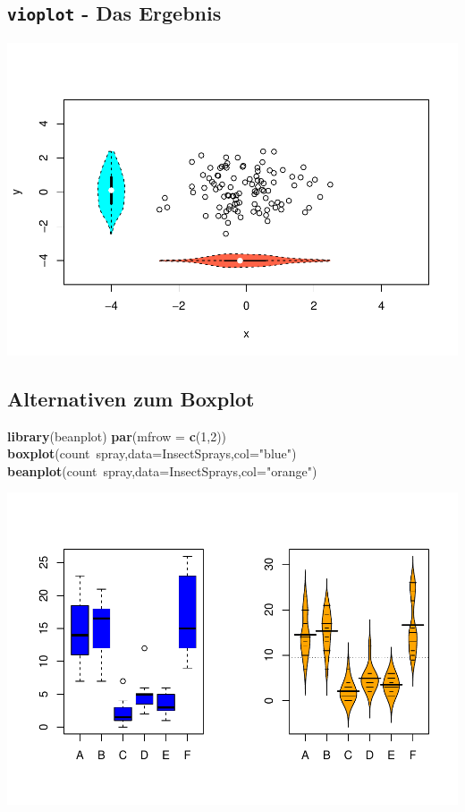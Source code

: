 \documentclass[]{article}
\newenvironment{Shaded}{\begin{snugshade}}{\end{snugshade}}
\newcommand{\KeywordTok}[1]{\textcolor[rgb]{0.13,0.29,0.53}{\textbf{{#1}}}}
\newcommand{\DataTypeTok}[1]{\textcolor[rgb]{0.13,0.29,0.53}{{#1}}}
\newcommand{\DecValTok}[1]{\textcolor[rgb]{0.00,0.00,0.81}{{#1}}}
\newcommand{\StringTok}[1]{\textcolor[rgb]{0.31,0.60,0.02}{{#1}}}
\newcommand{\NormalTok}[1]{{#1}}
\begin{document}
\subsection{\texorpdfstring{\texttt{vioplot} - Das
Ergebnis}{vioplot - Das Ergebnis}}\label{vioplot---das-ergebnis}

\includegraphics{Intro_Datenanalyse1_files/figure-latex/unnamed-chunk-156-1.pdf}

\subsection{Alternativen zum Boxplot}\label{alternativen-zum-boxplot}

\begin{Shaded}
\begin{Highlighting}[]
\KeywordTok{library}\NormalTok{(beanplot)}
\KeywordTok{par}\NormalTok{(}\DataTypeTok{mfrow =} \KeywordTok{c}\NormalTok{(}\DecValTok{1}\NormalTok{,}\DecValTok{2}\NormalTok{))}
\KeywordTok{boxplot}\NormalTok{(count~spray,}\DataTypeTok{data=}\NormalTok{InsectSprays,}\DataTypeTok{col=}\StringTok{"blue"}\NormalTok{)}
\KeywordTok{beanplot}\NormalTok{(count~spray,}\DataTypeTok{data=}\NormalTok{InsectSprays,}\DataTypeTok{col=}\StringTok{"orange"}\NormalTok{)}
\end{Highlighting}
\end{Shaded}

\includegraphics{Intro_Datenanalyse1_files/figure-latex/unnamed-chunk-157-1.pdf}
\end{document}
